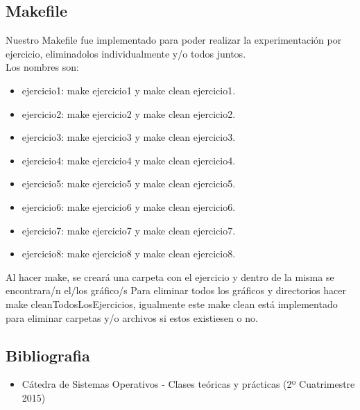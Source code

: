 
\subsection{Makefile}

Nuestro Makefile fue implementado para poder realizar la experimentaci\'on por ejercicio, eliminadolos individualmente y/o todos juntos.\\
Los nombres son:\\
\begin{itemize}
 \item ejercicio1: make ejercicio1 y make clean ejercicio1.
 \item ejercicio2: make ejercicio2 y make clean ejercicio2.
 \item ejercicio3: make ejercicio3 y make clean ejercicio3.
 \item ejercicio4: make ejercicio4 y make clean ejercicio4.
 \item ejercicio5: make ejercicio5 y make clean ejercicio5.
 \item ejercicio6: make ejercicio6 y make clean ejercicio6.
 \item ejercicio7: make ejercicio7 y make clean ejercicio7.
 \item ejercicio8: make ejercicio8 y make clean ejercicio8.
\end{itemize}

Al hacer make, se crear\'a una carpeta con el ejercicio y dentro de la misma se encontrara/n el/los gr\'afico/s
Para eliminar todos los gr\'aficos y directorios hacer make cleanTodosLosEjercicios, igualmente este make clean est\'a implementado
para eliminar carpetas y/o archivos si estos existiesen o no.\\

\subsection{Bibliografia}

\begin{itemize}
 \item C\'atedra de Sistemas Operativos - Clases te\'oricas y pr\'acticas (2º Cuatrimestre 2015)
 \end{itemize}